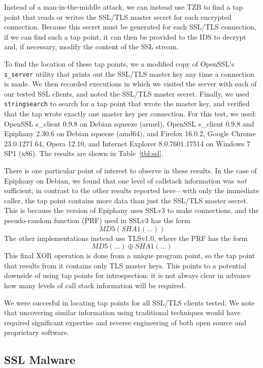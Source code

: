Instead of a man-in-the-middle attack, we can instead use TZB to find a
tap point that reads or writes the SSL/TLS master secret for each
encrypted connection. Because this secret must be generated for each
SSL/TLS connection, if we can find such a tap point, it can then be
provided to the IDS to decrypt and, if necessary, modify the content of
the SSL stream.

To find the location of these tap points, we a modified copy of
OpenSSL's \texttt{s\_server} utility that prints out the SSL/TLS master
key any time a connection is made. We then recorded executions in which
we visited the server with each of our tested SSL clients, and noted the
SSL/TLS master secret. Finally, we used \texttt{stringsearch} to search
for a tap point that wrote the master key, and verified that the tap
wrote exactly one master key per connection. For this test, we used:
OpenSSL s\_client 0.9.8 on Debian squeeze (armel), OpenSSL s\_client
0.9.8 and Epiphany 2.30.6 on Debian squeeze (amd64), and Firefox
16.0.2, Google Chrome 23.0.1271.64, Opera 12.10, and Internet Explorer
8.0.7601.17514 on Windows 7 SP1 (x86). The results are shown in
Table~\ref{tbl:ssl}.

There is one particular point of interest to observe in these results.
In the case of Epiphany on Debian, we found that one level of callstack
information was \emph{not} sufficient, in contrast to the other results
reported here---with only the immediate caller, the tap point contains
more data than just the SSL/TLS master secret. This is because the
version of Epiphany uses SSLv3 to make connections, and the
pseudo-random function (PRF) used in SSLv3 has the form
\[ MD5(SHA1(\ldots))\] The other implementations instead use TLSv1.0,
where the PRF has the form \[ MD5(\ldots) \oplus SHA1(\ldots) \] This final
XOR operation is done from a unique program point, so the tap point that
results from it contains only TLS master keys. This points to a
potential downside of using tap points for introspection: it is not
always clear in advance how many levels of call stack information will
be required.

We were succesful in locating tap points for all SSL/TLS clients tested.
We note that uncovering similar information using traditional techniques
would have required significant expertise and reverse engineering of
both open source and proprietary software.

\subsection{SSL Malware}
\label{sec:eval:subsec:sslmal}


